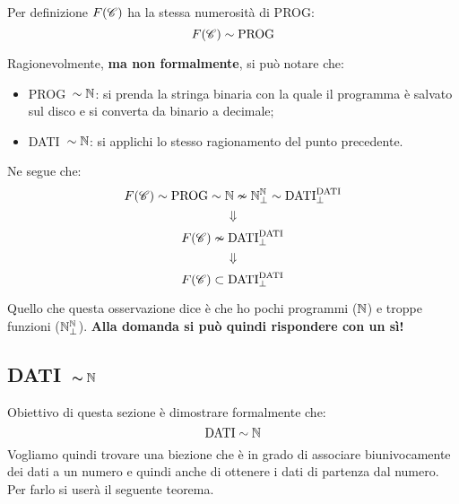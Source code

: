 Per definizione $F(\mathscr{C})$ ha la stessa numerosità di PROG:
$$ F(\mathscr{C}) \sim \text{PROG} $$

Ragionevolmente, \textbf{ma non formalmente}, si può notare che:
\begin{itemize}
    \item PROG\ $\sim\mathbb{N}$: si prenda la stringa binaria con la quale il programma è
        salvato sul disco e si converta da binario a decimale;
    \item DATI\ $\sim\mathbb{N}$: si applichi lo stesso ragionamento del punto precedente.
\end{itemize}
Ne segue che:
$$ F(\mathscr{C}) \sim \text{PROG} \sim \mathbb{N} \nsim\mathbb{N}^{\mathbb{N}}_\perp\sim \text{DATI}^\text{DATI}_\perp$$
$$ \Downarrow $$
$$ F(\mathscr{C}) \nsim \text{DATI}^\text{DATI}_\perp $$
$$ \Downarrow $$
$$ F(\mathscr{C}) \subset \text{DATI}^\text{DATI}_\perp $$

Quello che questa osservazione dice è che ho pochi programmi ($\mathbb{N}$) e troppe
funzioni ($\mathbb{N}^{\mathbb{N}}_\perp$).
\textbf{Alla domanda  si può quindi 
rispondere con un sì!}

\subsection{\texorpdfstring{DATI\ $\bm{\sim\mathbb{N}}$}{DATI~N}}
Obiettivo di questa sezione è dimostrare formalmente che:
$$ \text{DATI} \sim \mathbb{N} $$
Vogliamo quindi trovare una biezione che è in grado di associare biunivocamente
dei dati a un numero e quindi anche di ottenere i dati di partenza dal
numero. Per farlo si userà il seguente teorema.

